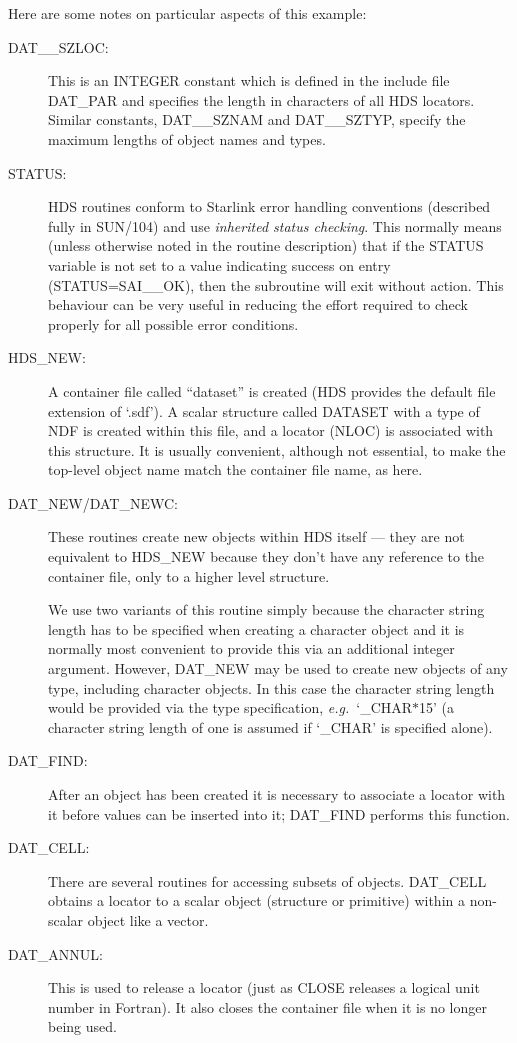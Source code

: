 Here are some notes on particular aspects of this example: 

\begin{description}

\item [DAT\_\_SZLOC:]
This is an INTEGER constant which is defined in the include file DAT\_PAR
and specifies the length in characters of all HDS locators. Similar
constants, DAT\_\_SZNAM and DAT\_\_SZTYP, specify the maximum lengths of
object names and types. 

\item [STATUS:]
HDS routines conform to Starlink error handling conventions (described fully
in SUN/104) and use {\em inherited status checking}. This normally means
(unless otherwise noted in the routine description) that if the STATUS
variable is not set to a value indicating success on entry
(STATUS=SAI\_\_OK), then the subroutine will exit without action. This
behaviour can be very useful in reducing the effort required to check
properly for all possible error conditions. 

\item [HDS\_NEW:]
A container file called ``dataset'' is created (HDS provides the default file
extension of `.sdf'). A scalar structure called DATASET with a type of NDF is
created within this file, and a locator (NLOC) is associated with this
structure. It is usually convenient, although not essential, to make the
top-level object name match the container file name, as here.

\item [DAT\_NEW/DAT\_NEWC:]
These routines create new objects within HDS itself --- they are not equivalent
to HDS\_NEW because they don't have any reference to the container file,
only to a higher level structure.

We use two variants of this routine simply because the character string length
has to be specified when creating a character object and it is normally most
convenient to provide this via an additional integer argument.  However, 
DAT\_NEW may be used to create new objects of any type, including character
objects. In this case the character string length would be provided via the
type specification, {\em e.g.}\ `\_CHAR$*$15' (a character string length of one
is assumed if `\_CHAR' is specified alone). 

\item [DAT\_FIND:]
After an object has been created it is necessary to associate a locator with
it before values can be inserted into it; DAT\_FIND performs this
function. 

\item [DAT\_CELL:]
There are several routines for accessing subsets of objects. DAT\_CELL
obtains a locator to a scalar object (structure or primitive) within a
non-scalar object like a vector. 

\item [DAT\_ANNUL:]
This is used to release a locator (just as CLOSE releases a logical unit number
in Fortran). It also closes the container file when it is no longer being used.

\end{description}

